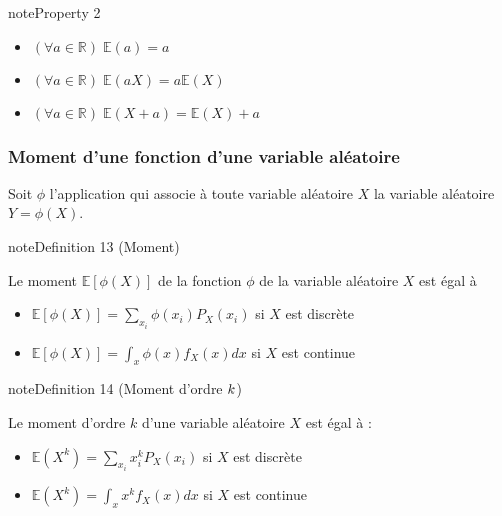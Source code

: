 \documentclass[letterpaper,10pt,english]{jupyterBook}
\begin{document}
\label{Rappels:property-27}
\begin{sphinxadmonition}{note}{Property 2}


\begin{itemize}
\item {} 
\sphinxAtStartPar
\((\forall a\in\mathbb{R})\; \mathbb{E}(a)= a\)

\item {} 
\sphinxAtStartPar
\((\forall a\in\mathbb{R})\; \mathbb{E}(aX)= a\mathbb{E}(X)\)

\item {} 
\sphinxAtStartPar
\((\forall a\in\mathbb{R})\; \mathbb{E}(X+a) = \mathbb{E}(X) +a\)

\end{itemize}
\end{sphinxadmonition}


\subsubsection{Moment d’une fonction d’une variable aléatoire}
\label{\detokenize{Rappels:moment-d-une-fonction-d-une-variable-aleatoire}}
\ignorespaces 
\sphinxAtStartPar
Soit \(\phi\) l’application qui associe à toute variable aléatoire \(X\) la variable aléatoire \(Y=\phi(X)\).
\label{Rappels:definition-28}
\begin{sphinxadmonition}{note}{Definition 13 (Moment)}



\sphinxAtStartPar
Le moment  \(\mathbb{E}[\phi(X)]\) de la fonction \(\phi\) de la variable aléatoire \(X\) est égal à
\begin{itemize}
\item {} 
\sphinxAtStartPar
\(\mathbb{E}[\phi(X)] = \displaystyle\sum_{x_i} \phi(x_i)P_X(x_i)\) si \(X\) est discrète

\item {} 
\sphinxAtStartPar
\(\mathbb{E}[\phi(X)] = \int_x \phi(x) f_X(x)dx\) si \(X\) est continue

\end{itemize}
\end{sphinxadmonition}

\ignorespaces \label{Rappels:definition-29}
\begin{sphinxadmonition}{note}{Definition 14 (Moment d’ordre \protect\(k\protect\))}



\sphinxAtStartPar
Le moment d’ordre \(k\) d’une variable aléatoire \(X\) est égal à :
\begin{itemize}
\item {} 
\sphinxAtStartPar
\(\mathbb{E}(X^k) = \displaystyle\sum_{x_i} x_i^k P_X(x_i)\) si \(X\) est discrète

\item {} 
\sphinxAtStartPar
\( \mathbb{E}(X^k) = \int_x x^k f_X(x)dx\) si \(X\) est continue

\end{itemize}
\end{sphinxadmonition}
\end{document}
